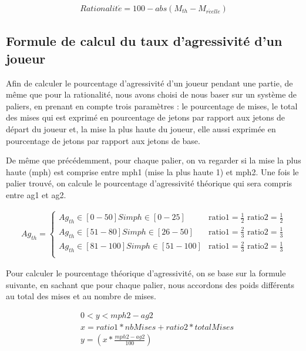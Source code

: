 \documentclass{report}
\begin{document}
\begin{align*}
Rationalit\acute{e} = 100-abs(M_{th}-M_{r\acute{e}elle})
\end{align*}

\subsection{Formule de calcul du taux d'agressivité d'un joueur}

\hspace{0.5cm}Afin de calculer le pourcentage d'agressivité d'un joueur pendant une partie, de même que pour la rationalité, nous avons choisi de nous baser sur un système de paliers, en prenant en compte trois paramètres : le pourcentage de mises, le total des mises qui est exprimé en pourcentage de jetons par rapport aux jetons de départ du joueur et, la mise la plus haute du joueur, elle aussi exprimée en pourcentage de jetons par rapport aux jetons de base.\par
De même que précédemment, pour chaque palier, on va regarder si la mise la plus haute (mph) est comprise entre mph1 (mise la plus haute 1) et mph2. Une fois le palier trouvé, on calcule le pourcentage d'agressivité théorique qui sera compris entre ag1 et ag2. \par


\small{
\begin{align*}
	Ag_{th}=
	\begin{cases}
		Ag_{th} \in [0-50] Si mph \in [0-25] &\text{ratio1}=\frac{1}{2} \text{ ratio2}=\frac{1}{2} \\
		Ag_{th} \in [51-80] Si mph \in [26-50] &\text{ratio1}=\frac{2}{3} \text{ ratio2}=\frac{1}{3} \\
		Ag_{th} \in [81-100] Si mph \in [51-100]  &\text{ratio1}=\frac{2}{3} \text{ ratio2}=\frac{1}{3}\\
	\end{cases}
\end{align*}

}

Pour calculer le pourcentage théorique d'agressivité, on se base sur la formule suivante, en sachant que pour chaque palier, nous accordons des poids différents au total des mises et au nombre de mises.\par

\begin{align*}
	&0<y<mph2-ag2\\
	&x=ratio1 * nbMises + ratio2 * totalMises\\
	&y=\left(x*\frac{mph2-ag2}{100}\right)
\end{align*}
\end{document}
